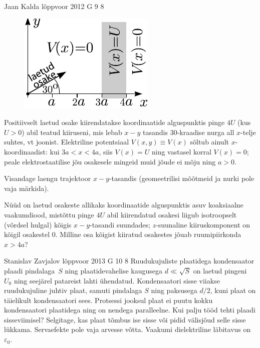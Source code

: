 \documentclass[11pt]{article}
\begin{document}
{%
{Jaan Kalda} %
{lõppvoor} %
{2012} %
{G 9} %
{8} %
{
\ifStatement
\begin{figure}%
\vspace{-10pt}
\includegraphics[width=\linewidth]{2012-v3g-09-laeng}%
\end{figure}
Positiivselt laetud osake kiirendatakse koordinaatide alguspunktis pinge $4U$ (kus $U>0$) abil teatud kiiruseni, mis
lebab $x-y$ tasandis $30$-kraadise nurga all $x$-telje suhtes, vt joonist. Elektriline potentsiaal $V(x,y)\equiv V(x)$
sõltub ainult $x$-koordinaadist: kui
$3a<x<4a$, siis $V(x)=U$ ning vastasel korral $V(x)=0$; peale elektrostaatilise jõu osakesele mingeid muid jõude ei mõju ning $a>0$.

\osa Visandage laengu trajektoor $x-y$-tasandis (geomeetrilisi mõõtmeid ja nurki pole vaja märkida).

\osa Nüüd on laetud osakeste allikaks koordinaatide alguspunktis asuv koaksiaalne vaakumdiood, mistõttu pinge $4U$
abil kiirendatud osakesi liigub isotroopselt (võrdsel hulgal) kõigis $x-y$-tasandi suundades;
$z$-suunaline kiiruskomponent on kõigil osakestel 0. Milline osa kõigist kiiratud osakestes jõuab ruumipiirkonda $x>4a$?
\fi
}

{Stanislav Zavjalov} %
{lõppvoor} %
{2013} %
{G 10} %
{8} %
{
\ifStatement
Ruudukujuliste plaatidega kondensaator plaadi pindalaga~$S$ ning plaatidevahelise
kaugusega $d \ll \sqrt{S}$ on laetud pingeni $U_0$ ning seejärel
patareist lahti ühendatud. Kondensaatori sisse viiakse ruudukujuline juhtiv
plaat, samuti pindalaga $S$ ning paksusega $d/2$, kuni plaat on täielikult
kondensaatori sees. Protsessi jooksul plaat ei puutu kokku
kondensaatori plaatidega ning on nendega paralleelne. Kui palju tööd tehti
plaadi sisseviimisel? Selgitage, kas plaat tõmbus ise sisse või pidid välisjõud
selle sisse lükkama. Servaefekte pole vaja arvesse võtta. Vaakumi dielektriline
läbitavus on $\varepsilon_0$.
\fi
}

}
\end{document}
